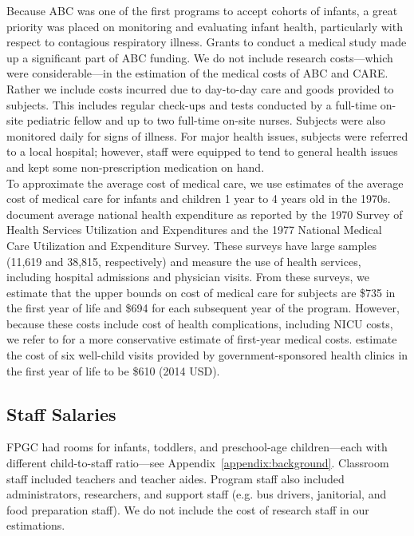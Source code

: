 \noindent Because ABC was one of the first programs to accept cohorts of infants, a great priority was placed on monitoring and evaluating infant health, particularly with respect to contagious respiratory illness. Grants to conduct a medical study made up a significant part of ABC funding. We do not include research costs---which were considerable---in the estimation of the medical costs of ABC and CARE. Rather we include costs incurred due to day-to-day care and goods provided to subjects. This includes regular check-ups and tests conducted  by a full-time on-site pediatric fellow and up to two full-time on-site nurses. Subjects were also monitored daily for signs of illness. For major health issues, subjects were referred to a local hospital; however, staff were equipped to tend to general health issues and kept some non-prescription medication on hand. \\

\noindent To approximate the average cost of medical care, we use  estimates of the average cost of medical care for infants and children 1 year to 4 years old in the 1970s. \cite{Cutler_Meara_1998_Med-Costs_BOOK} document average national health expenditure as reported by  the 1970 Survey of Health Services  Utilization  and Expenditures and the 1977 National Medical Care Utilization  and Expenditure Survey. These surveys have large samples (11,619 and 38,815, respectively) and measure the use of health services, including hospital admissions and physician visits. From these surveys, we estimate that the upper bounds on cost of medical care for subjects are \$735 in the first year of life and \$694 for each subsequent year of the program. However, because these costs include cost of health complications, including NICU costs, we refer to \cite{Robinson_etal_1974_FPP} for a more conservative estimate of first-year medical costs. \cite{Robinson_etal_1974_FPP} estimate the cost of six well-child visits provided by government-sponsored health clinics in the first year of life to be \$610 (2014 USD). \\

\subsection{Staff Salaries}
\noindent FPGC had rooms for infants, toddlers, and preschool-age children---each with different child-to-staff ratio---see Appendix~\ref{appendix:background}. Classroom staff included teachers and teacher aides. Program staff also included administrators, researchers, and support staff (e.g. bus drivers, janitorial, and food preparation staff). We do not include the cost of research staff in our estimations. \\

